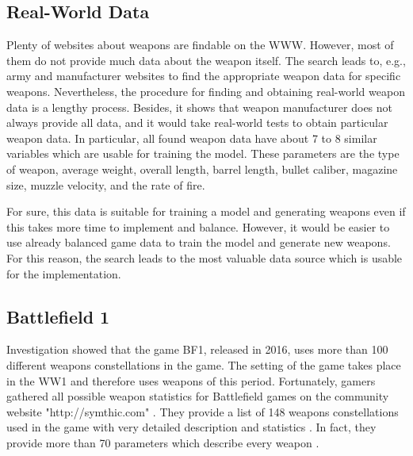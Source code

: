 \documentclass[MGS,Master,english]{twbook}%
\begin{document}
\subsection{Real-World Data}
Plenty of websites about weapons are findable on the \ac{WWW}. However, most of them do not provide much data about the weapon itself. The search leads to, e.g., army and manufacturer websites to find the appropriate weapon data for specific weapons. Nevertheless, the procedure for finding and obtaining real-world weapon data is a lengthy process. Besides, it shows that weapon manufacturer does not always provide all data, and it would take real-world tests to obtain particular weapon data. In particular, all found weapon data have about 7 to 8 similar variables which are usable for training the model. These parameters are the type of weapon, average weight, overall length, barrel length, bullet caliber, magazine size, muzzle velocity, and the rate of fire.

For sure, this data is suitable for training a model and generating weapons even if this takes more time to implement and balance. However, it would be easier to use already balanced game data to train the model and generate new weapons. For this reason, the search leads to the most valuable data source which is usable for the implementation.

\subsection{Battlefield 1}\label{bf1::data}
Investigation showed that the game \ac{BF1}, released in 2016, uses more than 100 different weapons constellations in the game. The setting of the game takes place in the \ac{WW1} and therefore uses weapons of this period. Fortunately, gamers gathered all possible weapon statistics for Battlefield games on the community website "http://symthic.com" \cite{symthic::bf1stats}. They provide a list of 148 weapons constellations used in the game with very detailed description and statistics \cite{symthic::bf1stats}. In fact, they provide more than 70 parameters which describe every weapon \cite{symthic::bf1stats}. 
\end{document}
